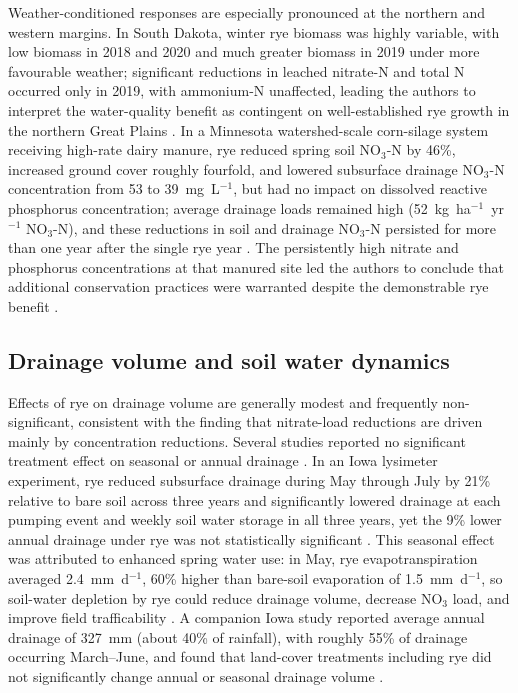 Weather-conditioned responses are especially pronounced at the northern and western margins. In South Dakota, winter rye biomass was highly variable, with low biomass in 2018 and 2020 and much greater biomass in 2019 under more favourable weather; significant reductions in leached nitrate-N and total N occurred only in 2019, with ammonium-N unaffected, leading the authors to interpret the water-quality benefit as contingent on well-established rye growth in the northern Great Plains \parencite{Bawa2023}. In a Minnesota watershed-scale corn-silage system receiving high-rate dairy manure, rye reduced spring soil NO$_3$-N by 46\%, increased ground cover roughly fourfold, and lowered subsurface drainage NO$_3$-N concentration from 53 to 39~mg~L$^{-1}$, but had no impact on dissolved reactive phosphorus concentration; average drainage loads remained high (52~kg~ha$^{-1}$~yr$^{-1}$ NO$_3$-N), and these reductions in soil and drainage NO$_3$-N persisted for more than one year after the single rye year \parencite{Krueger2013}. The persistently high nitrate and phosphorus concentrations at that manured site led the authors to conclude that additional conservation practices were warranted despite the demonstrable rye benefit \parencite{Krueger2013}.

\subsection{Drainage volume and soil water dynamics}
Effects of rye on drainage volume are generally modest and frequently non-significant, consistent with the finding that nitrate-load reductions are driven mainly by concentration reductions. Several studies reported no significant treatment effect on seasonal or annual drainage \parencite{Waring2020,Kaspar2012}. In an Iowa lysimeter experiment, rye reduced subsurface drainage during May through July by 21\% relative to bare soil across three years and significantly lowered drainage at each pumping event and weekly soil water storage in all three years, yet the 9\% lower annual drainage under rye was not statistically significant \parencite{Qi2010b}. This seasonal effect was attributed to enhanced spring water use: in May, rye evapotranspiration averaged 2.4~mm~d$^{-1}$, 60\% higher than bare-soil evaporation of 1.5~mm~d$^{-1}$, so soil-water depletion by rye could reduce drainage volume, decrease NO$_3$ load, and improve field trafficability \parencite{Qi2010b}. A companion Iowa study reported average annual drainage of 327~mm (about 40\% of rainfall), with roughly 55\% of drainage occurring March--June, and found that land-cover treatments including rye did not significantly change annual or seasonal drainage volume \parencite{Qi2011b}.

